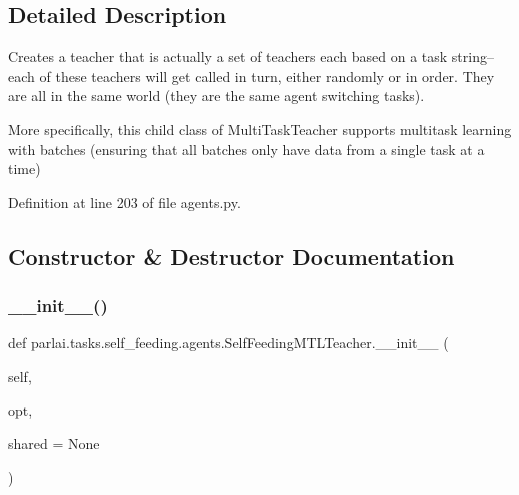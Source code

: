 \subsection{Detailed Description}
\begin{DoxyVerb}Creates a teacher that is actually a set of teachers each based on
a task string--each of these teachers will get called in turn,
either randomly or in order.
They are all in the same world (they are the same agent switching tasks).

More specifically, this child class of MultiTaskTeacher supports multitask learning
with batches (ensuring that all batches only have data from a single task at a time)
\end{DoxyVerb}
 

Definition at line 203 of file agents.\+py.



\subsection{Constructor \& Destructor Documentation}
\mbox{\label{classparlai_1_1tasks_1_1self__feeding_1_1agents_1_1SelfFeedingMTLTeacher_a422eb4bb783b661fb071405964faa27b}} 
\subsubsection{\texorpdfstring{\+\_\+\+\_\+init\+\_\+\+\_\+()}{\_\_init\_\_()}}
{\footnotesize\ttfamily def parlai.\+tasks.\+self\+\_\+feeding.\+agents.\+Self\+Feeding\+M\+T\+L\+Teacher.\+\_\+\+\_\+init\+\_\+\+\_\+ (\begin{DoxyParamCaption}\item[{}]{self,  }\item[{}]{opt,  }\item[{}]{shared = {\ttfamily None} }\end{DoxyParamCaption})}



